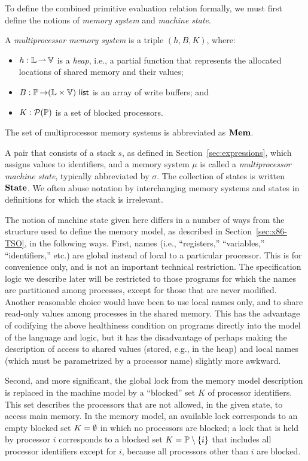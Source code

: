 \documentclass[11pt]{report}
\begin{document}
To define the combined primitive evaluation relation formally, we must first define the notions of \emph{memory system} and \emph{machine state}. 
\begin{definition}
A \emph{multiprocessor memory system} is a triple $(h,B,K)$, where: \begin{itemize}
	\item $h : \mathbb{L} \operatorname{\rightharpoonup} \mathbb{V}$ is a \emph{heap}, i.e., a partial function that represents the allocated locations of shared memory and their values; 
	\item $B : \mathbb{P} \operatorname{\rightarrow} (\mathbb{L} \times \mathbb{V})~\mathsf{list}$ is an array of write buffers; and
	\item $K : \mathcal{P}(\mathbb{P})$ is a set of blocked processors.
\end{itemize} 
\end{definition} 
The set of multiprocessor memory systems is abbreviated as $\mathbf{Mem}$.

A pair that consists of a stack $s$, as defined in Section~\ref{sec:expressions}, which assigns values to identifiers, and a memory system $\mu$ is called a \emph{multiprocessor machine state}, typically abbreviated by $\sigma$. The collection of states is written $\mathbf{State}$. We often abuse notation by interchanging memory systems and states in definitions for which the stack is irrelevant. 

The notion of machine state given here differs in a number of ways from the structure used to define the memory model, as described in Section~\ref{sec:x86-TSO}, in the following ways. First, names (i.e., ``registers,'' ``variables,'' ``identifiers,'' etc.) are global instead of local to a particular processor. This is for convenience only, and is not an important technical restriction. The specification logic we describe later will be restricted to those programs for which the names are partitioned among processes, except for those that are never modified. Another reasonable choice would have been to use local names only, and to share read-only values among processes in the shared memory. This has the advantage of codifying the above healthiness condition on programs directly into the model of the language and logic, but it has the disadvantage of perhaps making the description of access to shared values (stored, e.g., in the heap) and local names (which must be parametrized by a processor name) slightly more awkward.

Second, and more significant, the global lock from the memory model description is replaced in the machine model by a ``blocked'' set $K$ of processor identifiers. This set describes the processors that are not allowed, in the given state, to access main memory. In the memory model, an available lock corresponds to an empty blocked set $K = \operatorname{\emptyset}$ in which no processors are blocked; a lock that is held by processor $i$ corresponds to a blocked set $K = \mathbb{P} \setminus \left\lbrace i \right\rbrace$ that includes all processor identifiers except for $i$, because all processors other than $i$ are blocked. 
\end{document}
